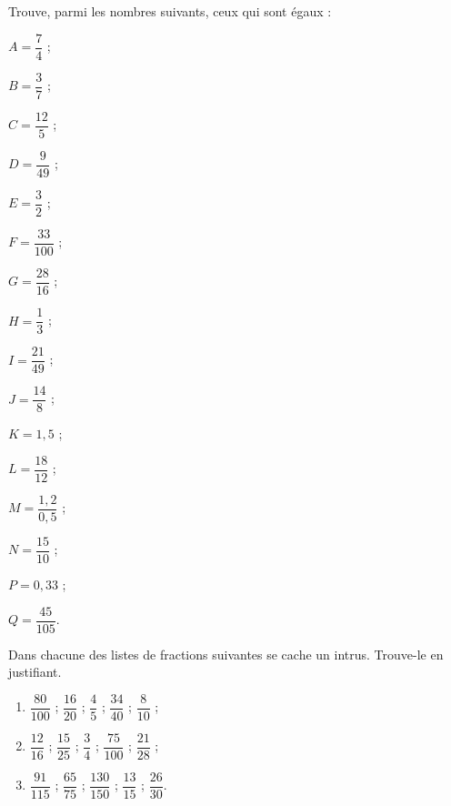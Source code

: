\begin{exercice}
Trouve, parmi les nombres suivants, ceux qui sont égaux :
\begin{colitemize}{3}
 \item $A = \dfrac{7}{4}$ ;
  \vspace{0.2cm}
 \item $B = \dfrac{3}{7}$ ;
   \vspace{0.2cm}
 \item $C = \dfrac{12}{5}$ ;
   \vspace{0.2cm}
 \item $D = \dfrac{9}{49}$ ;
   \vspace{0.2cm}
 \item $E = \dfrac{3}{2}$ ;
   \vspace{0.2cm}
 \item $F = \dfrac{33}{100}$ ;
 \item $G = \dfrac{28}{16}$ ;
 \item $H = \dfrac{1}{3}$ ;
 \item $I = \dfrac{21}{49}$ ;
 \item $J = \dfrac{14}{8}$ ;
 \item $K = 1,5$ ;
 \item $L = \dfrac{18}{12}$ ;
 \item $M = \dfrac{1,2}{0,5}$ ;
 \item $N = \dfrac{15}{10}$ ;
 \item $P = 0,33$ ;
 \item $Q = \dfrac{45}{105}$.
 \end{colitemize}
\end{exercice}


\begin{exercice}[Intrus]
Dans chacune des listes de fractions suivantes se cache un intrus. Trouve-le en justifiant.
\begin{enumerate}
 \item $\dfrac{80}{100}$ ; $\dfrac{16}{20}$ ; $\dfrac{4}{5}$ ; $\dfrac{34}{40}$ ; $\dfrac{8}{10}$ ;
 \vspace{0.2cm}
 \item $\dfrac{12}{16}$ ; $\dfrac{15}{25}$ ; $\dfrac{3}{4}$ ; $\dfrac{75}{100}$ ; $\dfrac{21}{28}$ ;
 \vspace{0.2cm}
 \item $\dfrac{91}{115}$ ; $\dfrac{65}{75}$ ; $\dfrac{130}{150}$ ; $\dfrac{13}{15}$ ; $\dfrac{26}{30}$.
 \end{enumerate}
\end{exercice}


